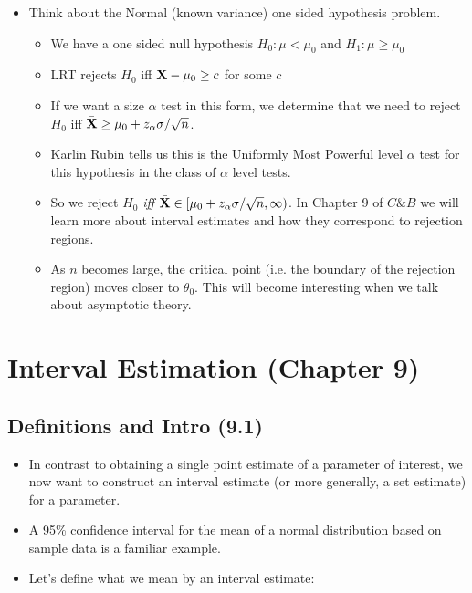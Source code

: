 \documentclass[11pt,]{article}
\def\bX{{\bf X}}
\def\bXbar{\bar{ \bX}}
\begin{document}
\begin{itemize}
\item Think about the Normal (known variance) one sided hypothesis problem. 
\begin{itemize}
\item We have a one sided null hypothesis $H_0: \mu < \mu_0$ and $H_1: \mu \geq \mu_0$
\item LRT rejects $H_0$ iff $\bXbar - \mu_0 \geq c$ for some $c$
\item If we want a size $\alpha$ test in this form, we determine that we need to reject $H_0$ iff $\bXbar \geq \mu_0 + z_\alpha \sigma/\sqrt{n}$.
\item Karlin Rubin tells us this is the Uniformly Most Powerful level $\alpha$ test for this hypothesis in the class of $\alpha$ level tests. 
\item So we reject $H_0$ {\em iff} $\bXbar \in [\mu_0 + z_\alpha \sigma/\sqrt{n},\infty)$. In Chapter 9 of $C\& B$ we will learn more about interval estimates and how they correspond to rejection regions.
\item As $n$ becomes large, the critical point (i.e. the boundary of the rejection region) moves closer to $\theta_0$. This will become interesting when we talk about asymptotic theory.
\end{itemize}
\end{itemize}

\newpage

\hypertarget{interval-estimation-chapter-9}{%
\section{Interval Estimation (Chapter
9)}\label{interval-estimation-chapter-9}}

\hypertarget{definitions-and-intro-9.1}{%
\subsection{Definitions and Intro
(9.1)}\label{definitions-and-intro-9.1}}

\begin{itemize}
\item In contrast to obtaining a single point estimate of a parameter of interest, we now want to construct an interval estimate (or more generally, a set estimate) for a parameter.
\item A 95\% confidence interval for the mean of a normal distribution based on sample data is a familiar example.
\item Let's define what we mean by an interval estimate:
\end{itemize}
\end{document}
